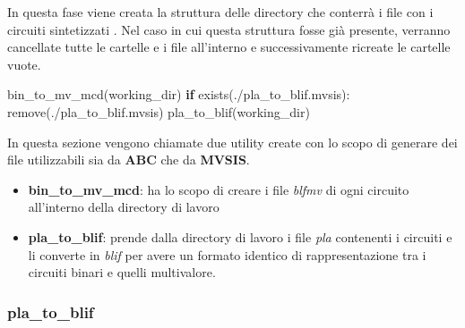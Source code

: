 \documentclass[
  italian,
]{book}
\newenvironment{Shaded}{\begin{snugshade}}{\end{snugshade}}
\newcommand{\ControlFlowTok}[1]{\textcolor[rgb]{0.13,0.29,0.53}{\textbf{#1}}}
\newcommand{\NormalTok}[1]{#1}
\newcommand{\StringTok}[1]{\textcolor[rgb]{0.31,0.60,0.02}{#1}}
\providecommand{\tightlist}{%
  \setlength{\itemsep}{0pt}\setlength{\parskip}{0pt}}
\begin{document}
In questa fase viene creata la struttura delle directory che conterrà i file con i circuiti sintetizzati . Nel caso in cui questa struttura fosse già presente, verranno cancellate tutte le cartelle e i file all'interno e successivamente ricreate le cartelle vuote.

\begin{Shaded}
\begin{Highlighting}[]
\NormalTok{bin\_to\_mv\_mcd(working\_dir)}
\ControlFlowTok{if}\NormalTok{ exists(}\StringTok{\textquotesingle{}./pla\_to\_blif.mvsis\textquotesingle{}}\NormalTok{):}
\NormalTok{  remove(}\StringTok{\textquotesingle{}./pla\_to\_blif.mvsis\textquotesingle{}}\NormalTok{)}
\NormalTok{pla\_to\_blif(working\_dir)}
\end{Highlighting}
\end{Shaded}

\newpage

In questa sezione vengono chiamate due utility create con lo scopo di generare dei file utilizzabili sia da \textbf{ABC} che da \textbf{MVSIS}.

\begin{itemize}
\tightlist
\item
  \textbf{bin\_to\_mv\_mcd}: ha lo scopo di creare i file \emph{blfmv} di ogni circuito all'interno della directory di lavoro
\item
  \textbf{pla\_to\_blif}: prende dalla directory di lavoro i file \emph{pla} contenenti i circuiti e li converte in \emph{blif} per avere un formato identico di rappresentazione tra i circuiti binari e quelli multivalore.
\end{itemize}

\newpage

\hypertarget{pla_to_blif}{%
\subsubsection{pla\_to\_blif}\label{pla_to_blif}}
\end{document}
